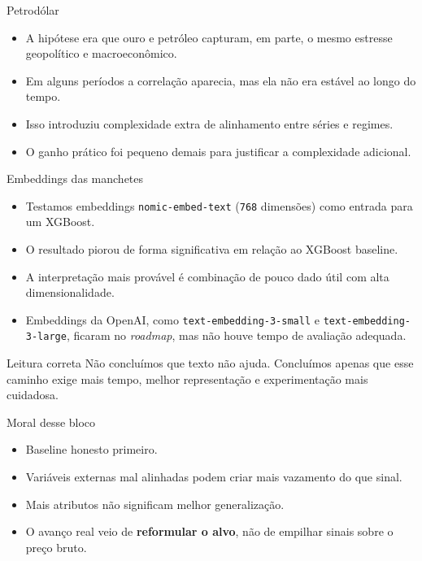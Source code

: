 \documentclass{libs/ufc_format}
\begin{document}
\begin{frame}{Petrodólar}
    \begin{itemize}
        \item A hipótese era que ouro e petróleo capturam, em parte, o mesmo estresse geopolítico e macroeconômico.
        \item Em alguns períodos a correlação aparecia, mas ela não era estável ao longo do tempo.
        \item Isso introduziu complexidade extra de alinhamento entre séries e regimes.
        \item O ganho prático foi pequeno demais para justificar a complexidade adicional.
    \end{itemize}

    \vspace{0.3cm}
\end{frame}

\begin{frame}{Embeddings das manchetes}
    \begin{itemize}
        \item Testamos embeddings \texttt{nomic-embed-text} (\texttt{768} dimensões) como entrada para um XGBoost.
        \item O resultado piorou de forma significativa em relação ao XGBoost baseline.
        \item A interpretação mais provável é combinação de pouco dado útil com alta dimensionalidade.
        \item Embeddings da OpenAI, como \texttt{text-embedding-3-small} e \texttt{text-embedding-3-large}, ficaram no \emph{roadmap}, mas não houve tempo de avaliação adequada.
    \end{itemize}

    \vspace{0.3cm}
    \begin{block}{Leitura correta}
        Não concluímos que texto não ajuda. Concluímos apenas que esse caminho exige mais tempo, melhor representação e experimentação mais cuidadosa.
    \end{block}
\end{frame}

\begin{frame}{Moral desse bloco}
    \begin{itemize}
        \item Baseline honesto primeiro.
        \item Variáveis externas mal alinhadas podem criar mais vazamento do que sinal.
        \item Mais atributos n\~ao significam melhor generalização.
        \item O avanço real veio de \textbf{reformular o alvo}, não de empilhar sinais sobre o preço bruto.
    \end{itemize}
\end{frame}
\end{document}
